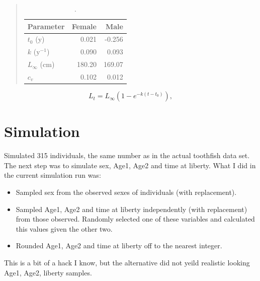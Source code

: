 \documentclass[11pt, a4paper]{article}
\begin{document}
\begin{table}[!htbp]
  \begin{quote}
    \caption{\label{tab:Dunn} .} \small{
      \begin{center}
        \begin{tabular}{lrr}
          \hline
          Parameter      & Female & Male\\
          \hline
          $t_0$ (y) & 0.021 & -0.256\\
          $k$ ($\text{y}^{-1}$) & 0.090 & 0.093\\
          $L_\infty$ (cm) & 180.20 & 169.07\\
          $c_v$ & 0.102 & 0.012\\
          \hline
        \end{tabular}
      \end{center}
    }
  \end{quote}
\end{table}

\begin{equation}
  L_t = L_\infty \left( 1 - e^{-k (t - t_0)} \right),
\end{equation}


\section{Simulation}
Simulated 315 individuals, the same number as in the actual toothfish data
set. The next step was to simulate sex, Age1, Age2 and time at liberty. What I
did in the current simulation run was:
\begin{itemize}
\item Sampled sex from the observed sexes of individuals (with replacement).
\item Sampled Age1, Age2 and time at liberty independently (with replacement)
  from those observed. Randomly selected one of these variables and calculated
  this values given the other two.
\item Rounded Age1, Age2 and time at liberty off to the nearest integer.
\end{itemize}
This is a bit of a hack I know, but the alternative did not yeild realistic
looking Age1, Age2, liberty samples.
\end{document}
